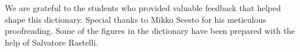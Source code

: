\documentclass[journal,12pt,onecolumn]{article}
\begin{document}
\noindent We are grateful to the students who provided valuable feedback that helped shape this dictionary. 
Special thanks to Mikko Seesto for his meticulous proofreading. Some of the 
figures in the dictionary have been prepared with the help of Salvatore Rastelli.



\newpage 


\newpage

\glsaddallunused



\printglossary[title={Machine Learning Concepts}, nonumberlist]

\printglossary[type=systems, title={Machine Learning Systems}, nonumberlist]


\newpage
{}
\pagestyle{empty}  %
\printindex  %




\newpage


\end{document}
